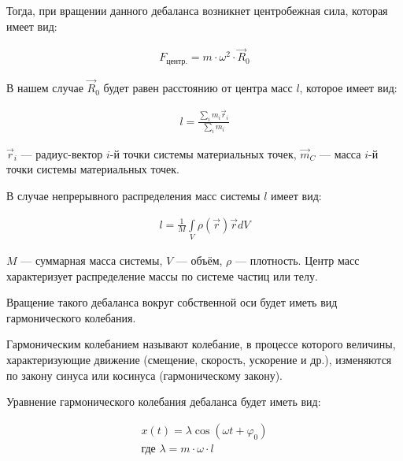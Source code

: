 Тогда, при вращении данного дебаланса возникнет центробежная сила, которая имеет вид:

\begin{equation}\label{eq:centrifugal}
    \begin{gathered}
        F_{\textrm{центр.}} = m \cdot \omega^2 \cdot \vec{R}_0
    \end{gathered}
\end{equation}

В нашем случае $\vec{R}_0$ будет равен расстоянию от центра масс $l$, которое имеет вид:

\begin{equation}\label{eq:distance_mass}
    \begin{gathered}
        l = \frac{\sum\limits_i m_i \vec{r}_i}{\sum\limits_i m_i}
    \end{gathered}
\end{equation}

$\vec {r}_i$ — радиус-вектор $i$-й точки системы материальных точек, $\vec {m}_C$ --- масса $i$-й точки системы материальных точек.

В случае непрерывного распределения масс системы $l$ имеет вид:

\begin{equation}\label{eq:distance_mass_2}
    \begin{gathered}
        l = \frac{1}{M} \int\limits_V \rho(\vec{r}) \vec{r} dV
    \end{gathered}
\end{equation}

$M$ — суммарная масса системы, $V$ — объём, $\rho$  — плотность. Центр масс характеризует распределение массы по системе частиц или телу.

Вращение такого дебаланса вокруг собственной оси будет иметь вид гармонического колебания.

\begin{definition}
    Гармоническим колебанием называют колебание, в процессе которого величины, характеризующие движение (смещение, скорость, ускорение и др.), изменяются по закону синуса или косинуса (гармоническому закону).
\end{definition}

Уравнение гармонического колебания дебаланса будет иметь вид:

\begin{equation}\label{eq:harmonic}
    \begin{gathered}
        x(t) = \lambda \cos (\omega t + \varphi_0) \\
        \textrm{где } \lambda = m \cdot \omega \cdot l
    \end{gathered}
\end{equation}

